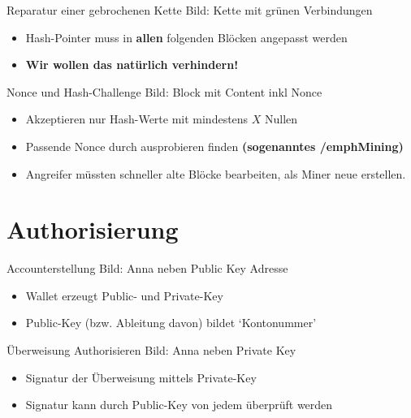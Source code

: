 \documentclass[aspectratio=169]{beamer}
\begin{document}
\begin{frame}{Reparatur einer gebrochenen Kette}
    Bild: Kette mit grünen Verbindungen
    \begin{itemize}
        \item Hash-Pointer muss in \textbf{allen} folgenden Blöcken angepasst werden
        \pause
        \item \textbf{Wir wollen das natürlich verhindern!}
    \end{itemize}
\end{frame}


\begin{frame}{Nonce und Hash-Challenge}
    Bild: Block mit Content inkl Nonce
    \begin{itemize}
        \item Akzeptieren nur Hash-Werte mit mindestens $X$ Nullen
        \item Passende Nonce durch ausprobieren finden \textbf{(sogenanntes /emph{Mining})}
        \item Angreifer müssten schneller alte Blöcke bearbeiten, als Miner neue erstellen.
    \end{itemize}
\end{frame}






\section{Authorisierung}

\begin{frame}{Accounterstellung}
    Bild: Anna neben Public Key Adresse
    \begin{itemize}
        \item Wallet erzeugt Public- und Private-Key
        \item Public-Key (bzw. Ableitung davon) bildet `Kontonummer'
    \end{itemize}
\end{frame}


\begin{frame}{Überweisung Authorisieren}
    Bild: Anna neben Private Key
    \begin{itemize}
        \item Signatur der Überweisung mittels Private-Key
        \item Signatur kann durch Public-Key von jedem überprüft werden
    \end{itemize}
\end{frame}
\end{document}
